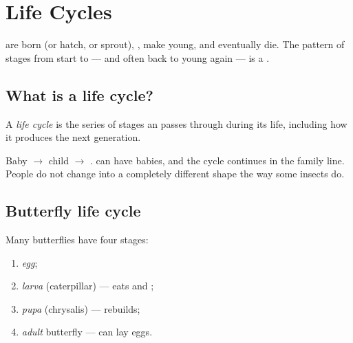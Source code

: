 \chapter{Life Cycles}\label{ch:g3:life-cycles}

 are born (or hatch, or sprout), , make young, and
eventually die. The pattern of stages from start to  --- and
often back to young again --- is a \emph{}.

\section{What is a life cycle?}

\begin{definition}\label{def:g3:life-cycles:cycle}
A \emph{life cycle} is the series of stages an
 passes through during its life, including how it produces
the next generation.
\end{definition}


\begin{example}[People]\label{ex:g3:life-cycles:people}
Baby $\to$ child $\to$ .  can have babies, and the cycle
continues in the family line. People do not change into a completely
different shape the way some insects do.
\end{example}

\section{Butterfly life cycle}

\begin{definition}\label{def:g3:life-cycles:butterfly}
Many butterflies have four stages:
\begin{enumerate}
  \item \emph{egg};
  \item \emph{larva} (caterpillar) --- eats and ;
  \item \emph{pupa} (chrysalis) ---  rebuilds;
  \item \emph{adult} butterfly --- can lay eggs.
\end{enumerate}
\end{definition}

